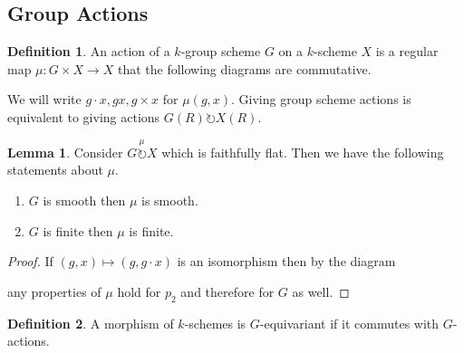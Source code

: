 \documentclass[10pt]{article}
\numberwithin{equation}{section}
\theoremstyle{definition}
\newtheorem{definition}{Definition}[section]
\newtheorem{lemma}{Lemma}[section]
\DeclareMathOperator{\id}{id}
\begin{document}
\subsection{Group Actions}
\begin{definition}
    \label{definition_26}
    An action of a $k$-group scheme $G$ on a $k$-scheme $X$ is a regular map $\mu:G\times X\to X$ that the following diagrams are commutative.
    \begin{center}
    \end{center}
    We will write $g\cdot x, gx, g\times x$ for $\mu(g,x)$. Giving group scheme actions is equivalent to giving actions $G(R)\circlearrowright X(R)$.
\end{definition}
\begin{lemma}
    \label{lemma_27}
    Consider $G\stackrel{\mu}{\circlearrowright}X$ which is faithfully flat. Then we have the following statements about $\mu$.
    \begin{enumerate}
        \item $G$ is smooth then $\mu$ is smooth.
        \item $G$ is finite then $\mu$ is finite.
    \end{enumerate}
\end{lemma}
\begin{proof}
    If $(g,x)\mapsto (g,g\cdot x)$ is an isomorphism then by the diagram 
    \begin{center}
    \end{center}
    any properties of $\mu$ hold for $p_2$ and therefore for $G$ as well.
\end{proof}
\begin{definition}
    A morphism of $k$-schemes is $G$-equivariant if it commutes with $G$-actions.
\end{definition}
\end{document}

